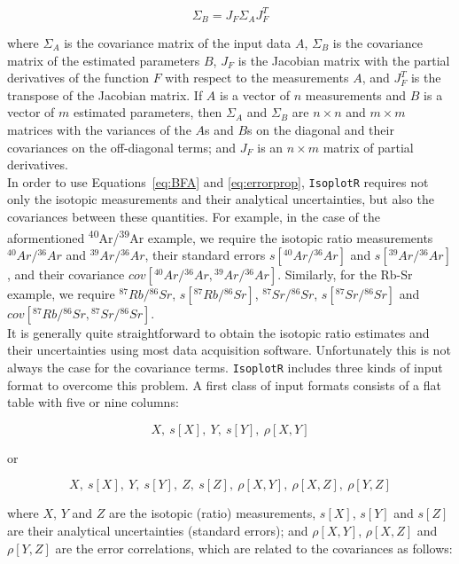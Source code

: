 \documentclass{article}
\begin{document}
\begin{equation}
  \Sigma_B = J_F \Sigma_A J_F^T
  \label{eq:errorprop}
\end{equation}

\noindent where $\Sigma_A$ is the covariance matrix of the input data
$A$, $\Sigma_B$ is the covariance matrix of the estimated parameters
$B$, $J_F$ is the Jacobian matrix with the partial derivatives of the
function $F$ with respect to the measurements $A$, and $J_F^T$ is the
transpose of the Jacobian matrix. If $A$ is a vector of $n$
measurements and $B$ is a vector of $m$ estimated parameters, then
$\Sigma_A$ and $\Sigma_B$ are $n \times n$ and $m \times m$ matrices
with the variances of the $A$s and $B$s on the diagonal and their
covariances on the off-diagonal terms; and $J_F$ is an $n \times m$
matrix of partial derivatives.\\

In order to use Equations~\ref{eq:BFA} and \ref{eq:errorprop},
\texttt{IsoplotR} requires not only the isotopic measurements and
their analytical uncertainties, but also the covariances between these
quantities. For example, in the case of the aformentioned
\textsuperscript{40}Ar/\textsuperscript{39}Ar example, we require the
isotopic ratio measurements ${}^{40}Ar/{}^{36}Ar$ and
${}^{39}Ar/{}^{36}Ar$, their standard errors $s[{}^{40}Ar/{}^{36}Ar]$
and $s[{}^{39}Ar/{}^{36}Ar]$, and their covariance
$cov[{}^{40}Ar/{}^{36}Ar,{}^{39}Ar/{}^{36}Ar]$. Similarly, for the
Rb-Sr example, we require ${}^{87}Rb/{}^{86}Sr$,
$s[{}^{87}Rb/{}^{86}Sr]$, ${}^{87}Sr/{}^{86}Sr$,
$s[{}^{87}Sr/{}^{86}Sr]$ and
$cov[{}^{87}Rb/{}^{86}Sr,{}^{87}Sr/{}^{86}Sr]$.\\

It is generally quite straightforward to obtain the isotopic ratio
estimates and their uncertainties using most data acquisition
software. Unfortunately this is not always the case for the covariance
terms. \texttt{IsoplotR} includes three kinds of input format to
overcome this problem. A first class of input formats consists of a
flat table with five or nine columns:

\[
X,~s[X],~Y,~s[Y],~\rho[X,Y]
\]

\noindent or

\[
X,~s[X],~Y,~s[Y],~Z,~s[Z],~\rho[X,Y],~\rho[X,Z],~\rho[Y,Z]
\]

\noindent where $X$, $Y$ and $Z$ are the isotopic (ratio)
measurements, $s[X]$, $s[Y]$ and $s[Z]$ are their analytical
uncertainties (standard errors); and $\rho[X,Y]$, $\rho[X,Z]$ and
$\rho[Y,Z]$ are the error correlations, which are related to the
covariances as follows:\\
\end{document}
